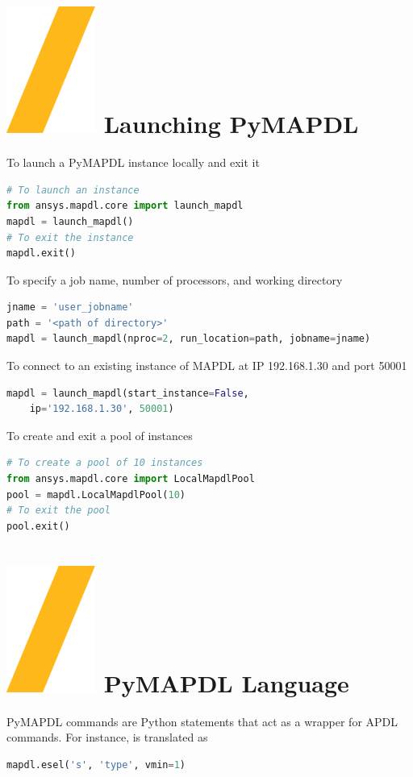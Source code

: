 \documentclass[9pt,landscape]{article}
\begin{document}
\begin{multicols}{3}
\setlength{\premulticols}{1pt}
\setlength{\postmulticols}{1pt}
\setlength{\multicolsep}{1pt}
\setlength{\columnsep}{2pt}

\section{\includegraphics[height=\fontcharht\font`\S]{slash.png} Launching PyMAPDL}
To launch a PyMAPDL instance locally and exit it
\begin{lstlisting}[language=Python]
# To launch an instance
from ansys.mapdl.core import launch_mapdl
mapdl = launch_mapdl()
# To exit the instance
mapdl.exit()
\end{lstlisting}

To specify a job name, number of processors, and working directory
\begin{lstlisting}[language=Python]
jname = 'user_jobname'
path = '<path of directory>'
mapdl = launch_mapdl(nproc=2, run_location=path, jobname=jname)
\end{lstlisting}

To connect to an existing instance of MAPDL at IP 192.168.1.30 and port 50001
\begin{lstlisting}[language=Python]
mapdl = launch_mapdl(start_instance=False,
    ip='192.168.1.30', 50001)
\end{lstlisting}
To create and exit a pool of instances
\begin{lstlisting}[language=Python]
# To create a pool of 10 instances
from ansys.mapdl.core import LocalMapdlPool
pool = mapdl.LocalMapdlPool(10)
# To exit the pool
pool.exit()
\end{lstlisting}

\section{\includegraphics[height=\fontcharht\font`\S]{slash.png} PyMAPDL Language}
PyMAPDL commands are Python statements that act as a wrapper for APDL commands. For instance,  is translated as
\begin{lstlisting}[language=Python]
mapdl.esel('s', 'type', vmin=1) 
\end{lstlisting}


\end{multicols}
\end{document}
